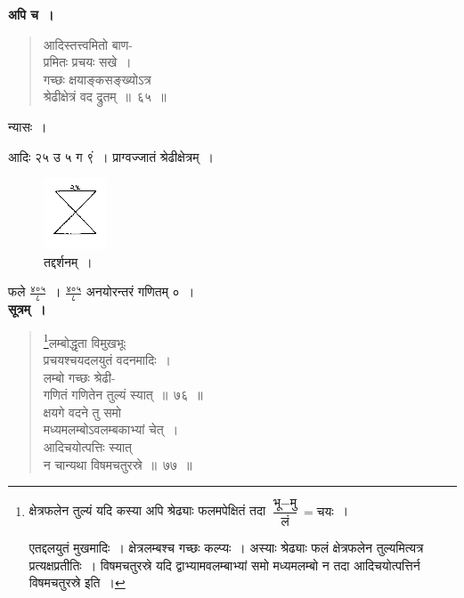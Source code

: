 \documentclass[11pt, openany]{book}
\begin{document}
\textbf{अपि च~।} 
\begin{quote}
    \bqt
     आदिस्तत्त्वमितो बाण-\\
     प्रमितः प्रचयः सखे~।\\
गच्छः क्षयाङ्कसङ्ख्योऽत्र \\
श्रेढीक्षेत्रं वद द्रुतम्~॥~६५~॥
\end{quote}

न्यासः~। \\
\vspace{-3mm}

आदिः २५ उ ५ ग ९ं~। प्राग्वज्जातं श्रेढीक्षेत्रम्~। 
\newpage
 
\begin{figure}[h!]
    \centering
  \captionsetup{labelformat=empty}
 \caption{तद्दर्शनम्~।}
\vspace{-2mm}
    \includegraphics[scale=0.85]{graphics/capture91.png}
\end{figure}
\vspace{-2mm}

फले $\frac{\mbox{४०५}}{\mbox{८}}$~। $\frac{\mbox{४०५}}{\mbox{८}}$ अनयोरन्तरं गणितम् ०~।\\

\textbf{सूत्रम्~।}
\begin{quote}
    \bs 
     \footnote{क्षेत्रफलेन तुल्यं यदि कस्या अपि श्रेढ्याः फलमपेक्षितं तदा $\dfrac{\mbox{भू} - \mbox{मु}}{\mbox{लं}} = \mbox{चयः}$~। \vspace{1mm}

\hspace{3mm} एतद्दलयुतं मुखमादिः~। क्षेत्रलम्बश्च गच्छः कल्प्यः~। अस्याः श्रेढ्याः फलं क्षेत्रफलेन तुल्यमित्यत्र प्रत्यक्षप्रतीतिः~। विषमचतुरस्रे यदि
द्वाभ्यामवलम्बाभ्यां समो मध्यमलम्बो न तदा आदिचयोत्पत्तिर्न विषमचतुरस्रे
इति~। }लम्बोद्धृता विमुखभूः \\
प्रचयश्चयदलयुतं वदनमादिः~।\\
लम्बो गच्छः श्रेढी-\\
गणितं गणितेन तुल्यं स्यात्~॥~७६~॥ \\
क्षयगे वदने तु समो \\
मध्यमलम्बोऽवलम्बकाभ्यां चेत्~।\\
आदिचयोत्पत्तिः स्यात् \\
न चान्यथा विषमचतुरस्रे~॥~७७~॥
\end{quote}
\end{document}
